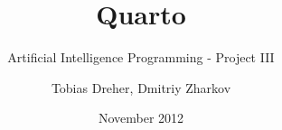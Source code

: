 
 

\title{Quarto}
\subtitle{Artificial Intelligence Programming - Project III}
\author{Tobias Dreher, Dmitriy Zharkov}
\date{November 2012}
\newcommand{\covertitle}{Quarto}
\newcommand{\coversubtitle}{Artificial Intelligence Programming - Project III}
\newcommand{\coverauthor}{Tobias Dreher, Dmitriy Zharkov}
\newcommand{\coverdate}{November 2012}



  
  \newpage

  \renewcommand{\thepage}{\Roman{page}}
  \setcounter{page}{1}
  
  \begin{spacing}{1.3}
	  \setcounter{tocdepth}{1}
	  \tableofcontents
  \end{spacing}
  \newpage

  \renewcommand{\thepage}{\arabic{page}}
  \setcounter{page}{1}

  
  


